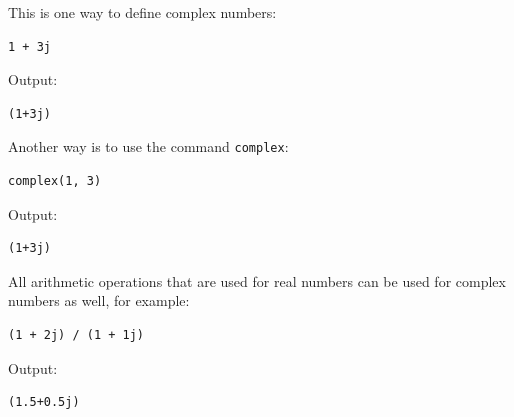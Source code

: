 \documentclass[article,A4,12pt]{llncs}
\begin{document}
\noindent
This is one way to define complex numbers:\\

\begin{bbox}
\begin{verbatim}
1 + 3j
\end{verbatim}
\end{bbox}
\vspace{6mm}

\noindent
Output:\\

\begin{ybox}
\begin{verbatim}
(1+3j)
\end{verbatim}
\end{ybox}
\vspace{6mm}

\noindent
Another way is to use the command {\tt complex}:\\

\begin{bbox}
\begin{verbatim}
complex(1, 3)
\end{verbatim}
\end{bbox}
\vspace{6mm}

\noindent
Output:\\

\begin{ybox}
\begin{verbatim}
(1+3j)
\end{verbatim}
\end{ybox}
\vspace{6mm}

\noindent
All arithmetic operations that are used for real numbers can be 
used for complex numbers as well, for example:\\

\begin{bbox}
\begin{verbatim}
(1 + 2j) / (1 + 1j)
\end{verbatim}
\end{bbox}
\vspace{6mm}

\noindent
Output:\\

\begin{ybox}
\begin{verbatim}
(1.5+0.5j)
\end{verbatim}
\end{ybox}
\vspace{6mm}
\end{document}

